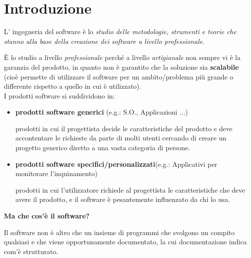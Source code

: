\documentclass[a4paper, 10pt]{article}
\begin{document}
	\begin{frontespizio}
	\end{frontespizio}
	\tableofcontents
	
	\tableofcontents
	
	\newpage
	
	\section{Introduzione}
	L' ingegneria del software è lo \textit{studio delle metodologie, strumenti e teorie che
		stanno alla base della creazione dei software a livello professionale}.
	
	\noindent
	È lo studio a livello \textit{professionale} perché a livello \textit{artigianale} non sempre vi è la garanzia del prodotto, in quanto non è garantito che la soluzione sia \textbf{scalabile} (cioè
	permette di utilizzare il software per un ambito/problema più grande o differente rispetto a quello in cui è utilizzato).\\
	I prodotti software si suddividono in:
	\begin{itemize}
		\item \textbf{prodotti software generici} (e.g.: S.O., Applicazioni ...)
		
		prodotti in cui il progettista decide le caratteristiche del prodotto e deve accontentare le richieste da parte di molti utenti cercando di creare un progetto generico diretto a  una vasta categoria di persone.
		\item \textbf{prodotti software specifici/personalizzati}(e.g.: Applicativi per monitorare l'inquinamento)
		
		prodotti in cui l'utilizzatore richiede al progettista le caratteristiche che deve avere il prodotto, e il software è pesantemente influenzato da chi lo usa.
	\end{itemize}
	
	\noindent
	\textbf{Ma che cos'è il software?} 
	
	\noindent
	Il software non è altro che un insieme di programmi che svolgono un compito qualsiasi e che viene opportunamente documentato, la cui documentazione indica com'è strutturato. \\
	
\end{document}
